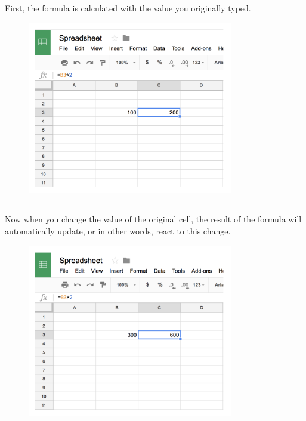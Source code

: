 \documentclass[
  letterpaper,
  DIV=11,
  numbers=noendperiod]{scrreprt}
\begin{document}
\hypertarget{section-29}{%
\subsection{}\label{section-29}}

First, the formula is calculated with the value you originally typed.

\begin{figure}

{\centering \includegraphics[width=0.8\textwidth,height=\textheight]{./images/spreadsheet-4.png}

}

\end{figure}

\hypertarget{section-30}{%
\subsection{}\label{section-30}}

Now when you change the value of the original cell, the result of the
formula will automatically update, or in other words, react to this
change.

\begin{figure}

{\centering \includegraphics[width=0.8\textwidth,height=\textheight]{./images/spreadsheet-5.png}

}

\end{figure}
\end{document}

